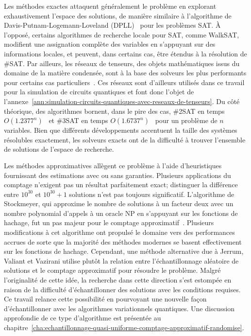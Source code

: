Les méthodes exactes attaquent généralement le problème en explorant exhaustivement l'espace des solutions, de manière similaire à l'algorithme de Davis-Putnam-Logemann-Loveland (DPLL)~\cite{davisMachineProgramTheoremproving1962} pour les problèmes SAT. À l'opposé, certains algorithmes de recherche locale pour SAT, comme WalkSAT, modifient une assignation complète des variables en s'appuyant sur des informations locales, et peuvent, dans certains cas, être étendus à la résolution de \#SAT. Par ailleurs, les réseaux de tenseurs, des objets mathématiques issus du domaine de la matière condensée, sont à la base des solveurs les plus performants pour certains cas particuliers~\cite{kourtisFastCountingTensor2019, dudekEfficientContractionLarge2020, dudekParallelWeightedModel2021}. Ces réseaux sont d'ailleurs utilisés dans ce travail pour la simulation de circuits quantiques et font donc l'objet de l'annexe~\ref{ann:simulation-circuits-quantiques-avec-reseaux-de-tenseurs}. Du côté théorique, des algorithmes bornent, dans le pire des cas, \#2SAT en temps $O(1.2377^{n})$~\cite{wahlstromTighterBoundCounting2008a} et \#3SAT en temps $O(1.6737^{n})$~\cite{dahllofCountingModels2SAT2005} pour un problème de $n$ variables. Bien que différents développements accentuent la taille des systèmes résolubles exactement, les solveurs exacts ont de la difficulté à trouver l'ensemble de solutions de l'espace de recherche.

Les méthodes approximatives allègent ce problème à l'aide d'heuristiques fournissant des estimations avec ou sans garanties. Plusieurs applications du comptage n'exigent pas un résultat parfaitement exact; distinguer la différence entre $10^{30}$ et $10^{30}+1$ solutions n'est pas toujours significatif. L'algorithme de Stockmeyer, qui approxime le nombre de solutions à un facteur deux avec un nombre polynomial d'appels à un oracle \textsf{NP} en s'appuyant sur les fonctions de hachage, fut un pas majeur pour le comptage approximatif~\cite{stockmeyerComplexityApproximateCounting1983}. Plusieurs modifications à cet algorithme ont propulsé le domaine vers des performances accrues de sorte que la majorité des méthodes modernes se basent effectivement sur les fonctions de hachage. Cependant, une méthode alternative due à Jerrum, Valiant et Vazirani utilise plutôt la relation entre l'échantillonnage aléatoire de solutions et le comptage approximatif pour résoudre le problème. Malgré l'originalité de cette idée, la recherche dans cette direction s'est estompée en raison de la difficulté d'échantillonner des solutions avec les conditions requises. Ce travail relance cette possibilité en pourvoyant une nouvelle façon d'échantillonner avec les algorithmes variationnels quantiques. Une discussion approfondie de ce type d'algorithme est présentée au chapitre~\ref{cha:echantillonnage-quasi-uniforme-comptage-approximatif-randomise}.

